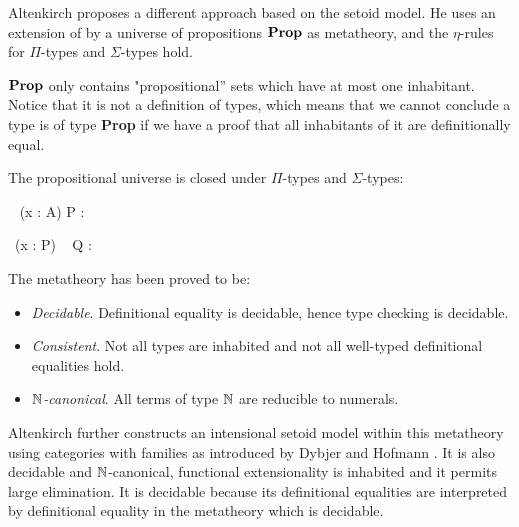 Altenkirch \cite{alti:lics99}  proposes a different approach based on the setoid model.
He uses an extension of \itt by a universe of propositions $\operatorname{\mathbf{Prop}}$ as metatheory, and the $\eta$-rules for $\Pi$-types and $\Sigma$-types hold. 








 $\operatorname{\mathbf{Prop}}$ only contains "propositional'' sets which have at most one
inhabitant. Notice that it is not a definition of types, which means
that we cannot conclude a type is of type \textbf{Prop} if we have a
proof that all inhabitants of it are definitionally equal.

The propositional universe is closed under $\Pi$-types and $\Sigma$-types:



{\Gamma \vdash \Pi~ (x : A) \to P : \Prop}



{\Gamma \vdash \Sigma ~(x : P) ~ Q : \Prop}


The metatheory has been proved {\cite{alti:lics99}} to be:

\begin{itemize}
\item \emph{Decidable}. Definitional equality is decidable, hence type checking is decidable.

\item \emph{Consistent}. Not all types are inhabited and not all well-typed definitional equalities hold. 

\item \emph{$\mathbb{N}$-canonical}. All terms of type $\mathbb{N}$ are reducible to numerals.
\end{itemize}

Altenkirch further constructs an intensional setoid model within this metatheory using categories with families as introduced by Dybjer \cite{Dyb:96} and Hofmann
\cite{hof:97}.  
It is also decidable and $\mathbb{N}$-canonical, functional extensionality is inhabited and it permits large elimination. 
It is decidable because its definitional equalities are interpreted by definitional equality in the metatheory which is decidable.

